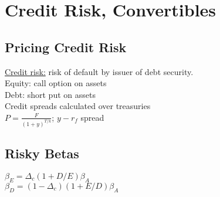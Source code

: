 \section{Credit Risk, Convertibles}
	\subsection*{Pricing Credit Risk}
	\underline{Credit risk:} risk of default by issuer of debt security.\\
	Equity: call option on assets\\
	Debt: short put on assets\\
	Credit spreads calculated over treasuries\\
	$P = \frac{F}{\left(1 + y\right)^{T/k}}$; $y - r_{f}$ spread
	
	\subsection*{Risky Betas}
	$\beta_{E} = \Delta_{c}\left(1 + D/E\right)\beta_{A}$\\
	$\beta_{D} = \left(1 - \Delta_{c}\right)\left(1 + E/D\right)\beta_{A}$
	